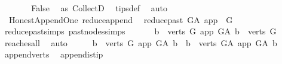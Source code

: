 \begin{isabellebody}
\ \ \ \ \isamarkupfalse%
\ \isamarkupfalse%
\ {\isachardoublequoteopen}False{\isachardoublequoteclose}\ \isamarkupfalse%
\ as{}\ CollectD\ \isamarkupfalse%
\ tips{\isacharunderscore}{\kern0pt}def\ \isamarkupfalse%
\ auto\isanewline
\ \ \isamarkupfalse%
\isanewline
{}\isamarkupfalse%
%
\endisatagproof
{\isafoldproof}%
%
\isadelimproof
\isanewline
%
\endisadelimproof
\isanewline
{}\isamarkupfalse%
\ {\isacharparenleft}{\kern0pt}\ Honest{\isacharunderscore}{\kern0pt}Append{\isacharunderscore}{\kern0pt}One{\isacharparenright}{\kern0pt}\ reduce{\isacharunderscore}{\kern0pt}append{\isacharcolon}{\kern0pt}\isanewline
\ \ {\isachardoublequoteopen}reduce{\isacharunderscore}{\kern0pt}past\ G{\isacharunderscore}{\kern0pt}A\ app\ {\isacharequal}{\kern0pt}\ G{\isachardoublequoteclose}\isanewline
%
\isadelimproof
\ \ %
\endisadelimproof
%
\isatagproof
{}\isamarkupfalse%
\ reduce{\isacharunderscore}{\kern0pt}past{\isachardot}{\kern0pt}simps\ past{\isacharunderscore}{\kern0pt}nodes{\isachardot}{\kern0pt}simps\ \isanewline
{}\isamarkupfalse%
\ {\isacharminus}{\kern0pt}\isanewline
\ \ \isamarkupfalse%
\ {\isachardoublequoteopen}{\isacharbraceleft}{\kern0pt}b\ {\isasymin}\ verts\ G{\isachardot}{\kern0pt}\ app\ {\isasymrightarrow}\isactrlsup {\isacharplus}{\kern0pt}\isactrlbsub G{\isacharunderscore}{\kern0pt}A\isactrlesub \ b{\isacharbraceright}{\kern0pt}\ {\isacharequal}{\kern0pt}\ verts\ G{\isachardoublequoteclose}\isanewline
\ \ \ \ \isamarkupfalse%
\ reaches{\isacharunderscore}{\kern0pt}all\ \isamarkupfalse%
\ auto\isanewline
\ \ \isamarkupfalse%
\ \isamarkupfalse%
\ {\isachardoublequoteopen}{\isacharbraceleft}{\kern0pt}b\ {\isasymin}\ verts\ G{\isachardot}{\kern0pt}\ app\ {\isasymrightarrow}\isactrlsup {\isacharplus}{\kern0pt}\isactrlbsub G{\isacharunderscore}{\kern0pt}A\isactrlesub \ b{\isacharbraceright}{\kern0pt}\ {\isacharequal}{\kern0pt}\ {\isacharbraceleft}{\kern0pt}b\ {\isasymin}\ verts\ G{\isacharunderscore}{\kern0pt}A{\isachardot}{\kern0pt}\ app\ {\isasymrightarrow}\isactrlsup {\isacharplus}{\kern0pt}\isactrlbsub G{\isacharunderscore}{\kern0pt}A\isactrlesub \ b{\isacharbraceright}{\kern0pt}{\isachardoublequoteclose}\isanewline
\ \ \ \ \isamarkupfalse%
\ append{\isacharunderscore}{\kern0pt}verts\ \isamarkupfalse%
\ append{\isacharunderscore}{\kern0pt}is{\isacharunderscore}{\kern0pt}tip\ \isamarkupfalse%

\end{isabellebody}
